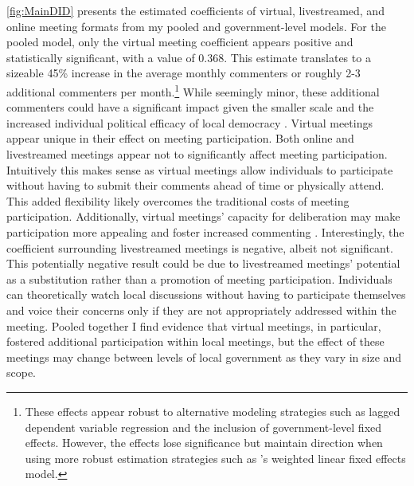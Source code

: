     \autoref{fig:MainDID} presents the estimated coefficients of virtual, livestreamed, and online meeting formats from my pooled and government-level models. For the pooled model, only the virtual meeting coefficient appears positive and statistically significant, with a value of 0.368. This estimate translates to a sizeable 45\% increase in the average monthly commenters or roughly 2-3 additional commenters per month.\footnote{These effects appear robust to alternative modeling strategies such as lagged dependent variable regression and the inclusion of government-level fixed effects. However, the effects lose significance but maintain direction when using more robust estimation strategies such as \citet{imaiUseTwoWayFixed2021}'s weighted linear fixed effects model.} While seemingly minor, these additional commenters could have a significant impact given the smaller scale and the increased individual political efficacy of local democracy \citep{oliverLocalElectionsPolitics2012}. Virtual meetings appear unique in their effect on meeting participation. Both online and livestreamed meetings appear not to significantly affect meeting participation. Intuitively this makes sense as virtual meetings allow individuals to participate without having to submit their comments ahead of time or physically attend. This added flexibility likely overcomes the traditional costs of meeting participation. Additionally, virtual meetings' capacity for deliberation may make participation more appealing and foster increased commenting \citep{collinsDoesMeetingStyle2021}. Interestingly, the coefficient surrounding livestreamed meetings is negative, albeit not significant. This potentially negative result could be due to livestreamed meetings' potential as a substitution rather than a promotion of meeting participation. Individuals can theoretically watch local discussions without having to participate themselves and voice their concerns only if they are not appropriately addressed within the meeting. Pooled together I find evidence that virtual meetings, in particular, fostered additional participation within local meetings, but the effect of these meetings may change between levels of local government as they vary in size and scope. 

